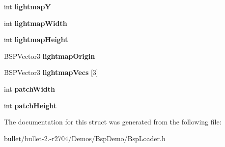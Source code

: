 \begin{DoxyCompactItemize}
\item 
\hypertarget{struct_b_s_p_surface_a12b9736a57c7a32af15f8856c5154492}{int {\bfseries lightmap\+Y}}\label{struct_b_s_p_surface_a12b9736a57c7a32af15f8856c5154492}

\item 
\hypertarget{struct_b_s_p_surface_a5f7656edc98cba1f2a26da3235871dec}{int {\bfseries lightmap\+Width}}\label{struct_b_s_p_surface_a5f7656edc98cba1f2a26da3235871dec}

\item 
\hypertarget{struct_b_s_p_surface_ad46b665635ad3389ad1f1bb255b8ab05}{int {\bfseries lightmap\+Height}}\label{struct_b_s_p_surface_ad46b665635ad3389ad1f1bb255b8ab05}

\item 
\hypertarget{struct_b_s_p_surface_a8be8817e666b02fb05ffdcfd20c8d84c}{B\+S\+P\+Vector3 {\bfseries lightmap\+Origin}}\label{struct_b_s_p_surface_a8be8817e666b02fb05ffdcfd20c8d84c}

\item 
\hypertarget{struct_b_s_p_surface_a4a571b83707b6c0778390ab856cef716}{B\+S\+P\+Vector3 {\bfseries lightmap\+Vecs} \mbox{[}3\mbox{]}}\label{struct_b_s_p_surface_a4a571b83707b6c0778390ab856cef716}

\item 
\hypertarget{struct_b_s_p_surface_af84fa60b557ce51c22a2c8a2eb3b7d38}{int {\bfseries patch\+Width}}\label{struct_b_s_p_surface_af84fa60b557ce51c22a2c8a2eb3b7d38}

\item 
\hypertarget{struct_b_s_p_surface_a4b94c7b0c306e8170c420aa596ca0de8}{int {\bfseries patch\+Height}}\label{struct_b_s_p_surface_a4b94c7b0c306e8170c420aa596ca0de8}

\end{DoxyCompactItemize}


The documentation for this struct was generated from the following file\+:\begin{DoxyCompactItemize}
\item 
bullet/bullet-\/2.-\/r2704/\+Demos/\+Bsp\+Demo/Bsp\+Loader.\+h\end{DoxyCompactItemize}
